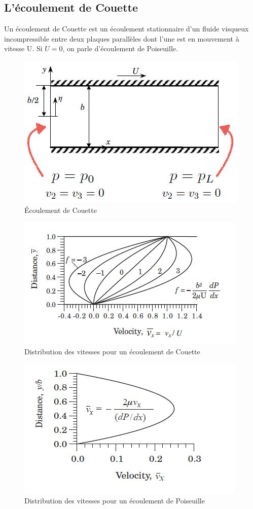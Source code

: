 \subsection{L'écoulement de Couette}
Un écoulement de Couette est un écoulement stationnaire d'un fluide visqueux incompressible entre deux plaques parallèles dont l'une est en mouvement à vitesse U. Si $U=0$, on parle d'écoulement de Poiseuille.
\begin{figure}[!h]
\centering
\includegraphics[scale=0.6]{./couette.jpg}
\caption{\'Ecoulement de Couette}
\label{fig:couette}
\end{figure}

\begin{figure}[!h]
\centering
\includegraphics[scale=0.6]{./couettegraphe.jpg}
\caption{Distribution des vitesses pour un écoulement de Couette}
\label{couettegraphe}
\end{figure}

\begin{figure}[!h]
\centering
\includegraphics[scale=0.6]{./poiseuille.jpg}
\caption{Distribution des vitesses pour un écoulement de Poiseuille}
\label{fig:poiseuille}
\end{figure}

